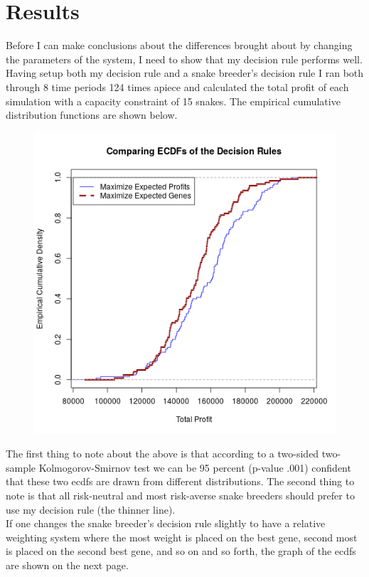 \documentclass{article}
\begin{document}
	\section*{Results}
	\indent\indent Before I can make conclusions about the differences brought about by changing the parameters of the system, I need to show that my decision rule performs well. Having setup both my decision rule and a snake breeder's decision rule I ran both through 8 time periods 124 times apiece and calculated the total profit of each simulation with a capacity constraint of 15 snakes. The empirical cumulative distribution functions are shown below.
	\begin{figure}[H]
	\centering
	\includegraphics[width=.75\textwidth]{ECDF.png}
	\end{figure}
	The first thing to note about the above is that according to a two-sided two-sample Kolmogorov-Smirnov test we can be 95 percent (p-value .001) confident that these two ecdfs are drawn from different distributions. The second thing to note is that all risk-neutral and most risk-averse snake breeders should prefer to use my decision rule (the thinner line).\\
	\indent If one changes the snake breeder's decision rule slightly to have a relative weighting system where the most weight is placed on the best gene, second most is placed on the second best gene, and so on and so forth, the graph of the ecdfs are shown on the next page.
\end{document}
